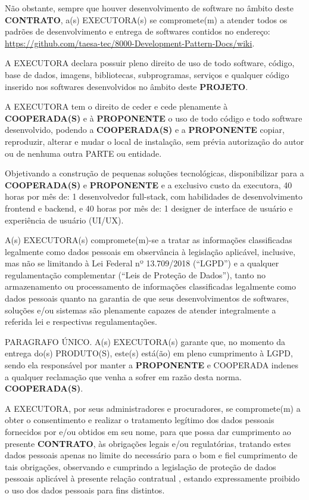 \xxx  Não obstante, sempre que houver desenvolvimento de software no âmbito deste \textbf{CONTRATO}, a(s) EXECUTORA(s) se compromete(m) a atender todos os padrões de desenvolvimento e entrega de softwares contidos no endereço: \url{https://github.com/taesa-tec/8000-Development-Pattern-Docs/wiki}.

\xx A EXECUTORA declara possuir pleno direito de uso de todo software, código, base de dados, imagens, bibliotecas, subprogramas, serviços e qualquer código inserido nos softwares desenvolvidos no âmbito deste \textbf{PROJETO}.

\xxx  A EXECUTORA tem o direito de ceder e cede plenamente à \textbf{COOPERADA(S)} e à \textbf{PROPONENTE} o uso de todo código e todo software desenvolvido, podendo a \textbf{COOPERADA(S)} e a \textbf{PROPONENTE} copiar, reproduzir, alterar e mudar o local de instalação, sem prévia autorização do autor ou de nenhuma outra PARTE ou entidade.

\xx Objetivando a construção de pequenas soluções tecnológicas, disponibilizar para a \textbf{COOPERADA(S)} e \textbf{PROPONENTE} e a exclusivo custo da executora, 40 horas por mês de: 1 desenvolvedor full-stack, com habilidades de desenvolvimento frontend e backend, e 40 horas por mês de: 1 designer de interface de usuário e experiência de usuário (UI/UX).

\xx A(s) EXECUTORA(s) compromete(m)-se a tratar as informações classificadas legalmente como dados pessoais em observância à legislação aplicável, inclusive, mas não se limitando à Lei Federal nº 13.709/2018 (“LGPD”) e a qualquer regulamentação complementar (“Leis de Proteção de Dados”), tanto no armazenamento ou processamento de informações classificadas legalmente como dados pessoais quanto na garantia de que seus desenvolvimentos de softwares, soluções e/ou sistemas são plenamente capazes de atender integralmente a referida lei e respectivas regulamentações.

\xx PARAGRAFO ÚNICO. A(s) EXECUTORA(s) garante que, no momento da entrega do(s) PRODUTO(S), este(s) está(ão) em pleno cumprimento à LGPD, sendo ela responsável por manter a \textbf{PROPONENTE} e COOPERADA indenes a qualquer reclamação que venha a sofrer em razão desta norma. \textbf{COOPERADA(S)}.

\xx A EXECUTORA, por seus administradores e procuradores, se compromete(m) a obter o consentimento e realizar o tratamento legítimo dos dados pessoais fornecidos por e/ou obtidos em seu nome, para que possa dar cumprimento ao presente \textbf{CONTRATO}, às obrigações legais e/ou regulatórias, tratando estes dados pessoais apenas no limite do necessário para o bom e fiel cumprimento de tais obrigações, observando e cumprindo a legislação de proteção de dados pessoais aplicável à presente relação contratual , estando expressamente proibido o uso dos dados pessoais para fins distintos.


